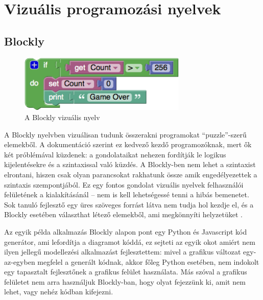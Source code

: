 


\section{Vizuális programozási nyelvek}

\subsection{Blockly}

\begin{figure}[!ht]
\centering
\includegraphics[width=8cm,keepaspectratio]{figures/blockly.png}
\caption{A Blockly vizuális nyelv}
\label{fig:blockly}
\end{figure}

A Blockly nyelvben vizuálisan tudunk összerakni programokat ``puzzle''-szerű elemekből. A dokumentáció szerint ez kedvező kezdő programozóknak, mert ők két próblémával küzdenek: a gondolataikat nehezen fordítják le logikus kijelentésekre és a szintaxissal való küzdés. A Blockly-ben nem lehet a szintaxist elrontani, hiszen csak olyan parancsokat rakhatunk össze amik engedélyezettek a szintaxis szempontjából. Ez egy fontos gondolat vizuális nyelvek felhasználói felületének a kialakításánál -- nem is kell lehetségessé tenni a hibás bemenetet. Sok tanuló fejlesztő egy üres szöveges forrást látva nem tudja hol kezdje el, és a Blockly esetében választhat létező elemekből, ami megkönnyíti helyzetüket \cite{blocklyref}.

Az egyik példa alkalmazás Blockly alapon pont egy Python és Javascript kód generátor, ami lefordítja a diagramot kóddá, ez sejteti az egyik okot amiért nem ilyen jellegű modellezési alkalmazást fejlesztettem: mivel a grafikus változat egy-az-egyben megfelel a generált kódnak, akkor főleg Python esetében, nem indokolt egy tapasztalt fejlesztőnek a grafikus felület használata. Más szóval a grafikus felületet nem arra használjuk Blockly-ban, hogy olyat fejezzünk ki, amit nem lehet, vagy nehéz kódban kifejezni. 


